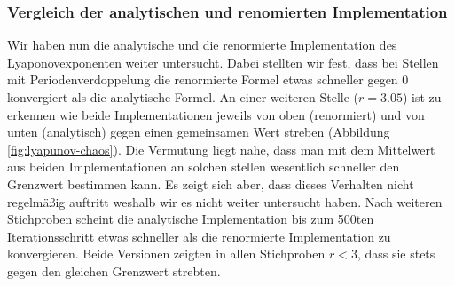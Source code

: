 \documentclass{scrartcl}
\begin{document}
\subsubsection{Vergleich der analytischen und renomierten Implementation}
Wir haben nun die analytische und die renormierte Implementation des Lyaponovexponenten weiter untersucht. Dabei stellten wir fest, dass bei Stellen mit Periodenverdoppelung die renormierte Formel etwas schneller gegen 0 konvergiert als die analytische Formel. An einer weiteren Stelle ($r=3.05$) ist zu erkennen wie beide Implementationen jeweils von oben (renormiert) und von unten (analytisch) gegen einen gemeinsamen Wert streben (Abbildung \ref{fig:lyapunov-chaos}). 
Die Vermutung liegt nahe, dass man mit dem Mittelwert aus beiden Implementationen an solchen stellen wesentlich schneller den Grenzwert bestimmen kann. Es zeigt sich aber, dass dieses Verhalten nicht regelmäßig auftritt weshalb wir es nicht weiter untersucht haben. Nach weiteren Stichproben scheint die analytische Implementation bis zum 500ten Iterationsschritt etwas schneller als die renormierte Implementation zu konvergieren. Beide Versionen zeigten in allen Stichproben $r<3$, dass sie stets gegen den gleichen Grenzwert strebten.
\end{document}
